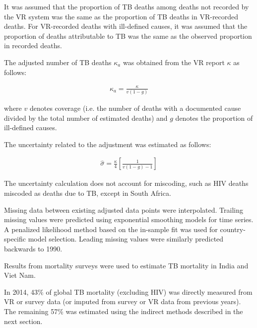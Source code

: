 It was assumed that the proportion of TB deaths among deaths not recorded by the VR system was the same as the proportion of TB deaths in VR-recorded deaths. For VR-recorded deaths with ill-defined causes, it was assumed that the proportion of deaths attributable to TB was the same as the observed proportion in recorded deaths. 

The adjusted number of TB deaths $\kappa_a$ was obtained from the VR report $\kappa$ as follows:

\begin{align*}
\kappa_a = \frac{\kappa}{v(1-g)}
\end{align*}

where $v$ denotes coverage (i.e. the number of deaths with a documented cause divided by the total number of estimated deaths) and $g$ denotes the proportion of ill-defined causes.

The uncertainty related to the adjustment was estimated as follows: 

\begin{align*}
\hat{\sigma} = \frac{\kappa}{4} \left[\frac{1}{v(1-g) -1}\right]
\end{align*}

The uncertainty calculation does not account for miscoding, such as HIV deaths miscoded as deaths due to TB, except in South Africa. 

Missing data between existing adjusted data points were interpolated. Trailing missing values were predicted using exponential smoothing models for time series\cite{Hyndman2008-ax}. A penalized likelihood method based on the in-sample fit was used for country-specific model selection. Leading missing values were similarly predicted backwards to 1990. 

Results from mortality surveys were used to estimate TB mortality in India and Viet Nam. 

In 2014, 43\% of global TB mortality (excluding HIV) was directly measured from VR or survey data (or imputed from survey or VR data from previous years). The remaining 57\% was estimated using the indirect methods described in the next section.




